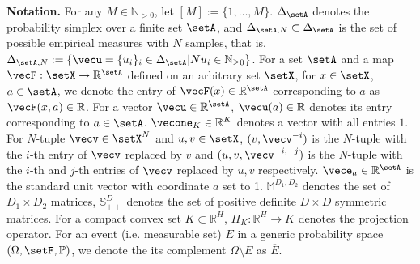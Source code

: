 \textbf{Notation.}
For any $M\in\mathbb{N}_{> 0}$, let $[M] := \{ 1, \ldots, M\}$. 
$\Delta_\setA$ denotes the probability simplex over a finite set $\setA$, and $\Delta_{\setA, N} \subset \Delta_\setA$ is the set of possible empirical measures with $N$ samples, that is, $\Delta_{\setA, N} := \{ \vecu = \{u_i\}_i \in\Delta_\setA | N u_i \in \mathbb{N}_{\geq 0} \}$.
For a set $\setA$ and a map $\vecF: \setX\rightarrow\mathbb{R}^{\setA}$ defined on an arbitrary set $\setX$, for $x\in\setX$, $a\in\setA$, we denote the entry of $\vecF(x)\in\mathbb{R}^{\setA}$ corresponding to $a$ as $\vecF(x, a) \in\mathbb{R}$.
For a vector $\vecu\in\mathbb{R}^{\setA}$, $\vecu(a) \in\mathbb{R}$ denotes its entry corresponding to $a\in\setA$.
$\vecone_K \in \mathbb{R}^K$ denotes a vector with all entries $1$.
For $N$-tuple $\vecv \in \setX^N$ and $u, v \in \setX$, $(v, \vecv^{-i})$ is the $N$-tuple with the $i$-th entry of $\vecv$ replaced by $v$ and $(u,v, \vecv^{-i, -j})$ is the $N$-tuple with the $i$-th and $j$-th entries of $\vecv$ replaced by $u,v$ respectively.
$\vece_a \in \mathbb{R}^\setA$ is the standard unit vector with coordinate $a$ set to 1.
$\mathbb{M}^{D_1,D_2}$ denotes the set of $D_1 \times D_2$ matrices, $\mathbb{S}_{++}^D$ denotes the set of positive definite $D\times D$ symmetric matrices. 
For a compact convex set $K \subset \mathbb{R}^H$, $\Pi_K: \mathbb{R}^H \rightarrow K$ denotes the projection operator.
For an event (i.e. measurable set) $E$ in a generic probability space $(\Omega, \setF, \mathbb{P})$, we denote the its complement $\Omega \setminus E$ as $\overline{E}$.
